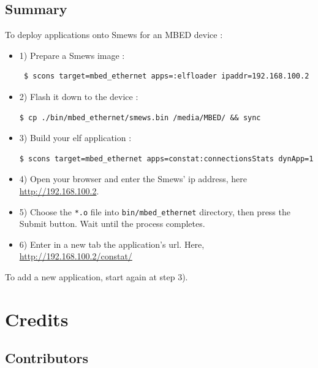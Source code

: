 \documentclass{report}
\begin{document}
\section{Summary}
  To deploy applications onto Smews for an MBED device :
\begin{itemize}
\item 1) Prepare a Smews image : \begin{verbatim} $ scons target=mbed_ethernet apps=:elfloader ipaddr=192.168.100.2\end{verbatim}
\item 2) Flash it down to the device : \begin{verbatim}$ cp ./bin/mbed_ethernet/smews.bin /media/MBED/ && sync\end{verbatim}
\item 3) Build your elf application : \begin{verbatim}$ scons target=mbed_ethernet apps=constat:connectionsStats dynApp=1\end{verbatim}
\item 4) Open your browser and enter the Smews' ip address, here \url{http://192.168.100.2}.
\item 5) Choose the \verb+*.o+ file into \verb+bin/mbed_ethernet+ directory, then press the Submit button. Wait until the process completes.
\item 6) Enter in a new tab the application's url. Here, \url{http://192.168.100.2/constat/}
\end{itemize}

  To add a new application, start again at step 3).

\chapter{Credits}

\section{Contributors}
\end{document}
